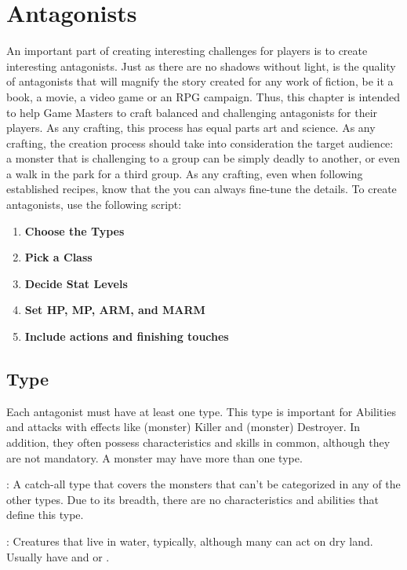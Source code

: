 \section{Antagonists}\label{sec:gm-antagonists}
\begin{multicols}{2}
An important part of creating interesting challenges for players is to create interesting antagonists. Just as there are no shadows without light, is the quality of antagonists that will magnify the story created for any work of fiction, be it a book, a movie, a video game or an RPG campaign. Thus, this chapter is intended to help Game Masters to craft balanced and challenging antagonists for their players. As any crafting, this process has equal parts art and science. As any crafting, the creation process should take into consideration the target audience: a monster that is challenging to a group can be simply deadly to another, or even a walk in the park for a third group. As any crafting, even when following established recipes, know that the you can always fine-tune the details. To create antagonists, use the following script:
\begin{enumerate}
    \item \textbf{Choose the Types}
    \item \textbf{Pick a Class}
    \item \textbf{Decide Stat Levels}
    \item \textbf{Set HP, MP, ARM, and MARM}
    \item \textbf{Include actions and finishing touches}
\end{enumerate}

\subsection{Type}\label{subsec:gm-types}
Each antagonist must have at least one type. This type is important for Abilities and attacks with effects like (monster) Killer and (monster) Destroyer. In addition, they often possess characteristics and skills in common, although they are not mandatory. A monster may have more than one type.

\tmtypeaberr{}: A catch-all type that covers the monsters that can’t be categorized in any of the other types. Due to its breadth, there are no characteristics and abilities that define this type.

\tmtypeaqua{}: Creatures that live in water, typically, although many can act on dry land. Usually have  and  or .


\end{multicols}
